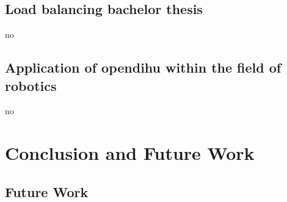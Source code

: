 \section{Load balancing bachelor thesis}
no
\section{Application of opendihu within the field of robotics} 
no

\chapter{Conclusion and Future Work}\label{sec:conclusion_and_future_work}

\section{Future Work}\label{sec:future_work}
 


